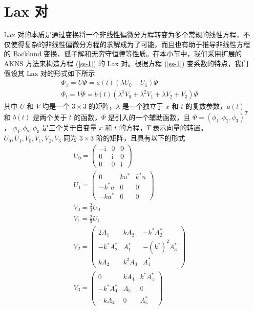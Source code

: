 \section{Lax 对}
Lax 对的本质是通过变换将一个非线性偏微分方程转变为多个常规的线性方程，不仅使得复杂的非线性偏微分方程的求解成为了可能，而且也有助于推导非线性方程的 Ba\"cklund 变换、孤子解和无穷守恒律等性质。在本小节中，我们采用扩展的 AKNS 方法来构造方程 (\ref{ss-1}) 的 Lax 对。根据方程 (\ref{ss-1}) 变系数的特点，我们假设其 Lax 对的形式如下所示
\begin{align}
  & \Phi_{x} = U\Phi = a(t)(\lambda U_{0} + U_{1})\Phi \label{ss-2}\\
  & \Phi_{t} = V\Phi = b(t)(\lambda^{3}V_{0} + \lambda^{2}V_{1} + \lambda V_{2} + V_{3})\Phi  \label{ss-3}
\end{align}
其中 $U$ 和 $V$ 均是一个 $3 \times 3$ 的矩阵，$\lambda$ 是一个独立于 $x$ 和 $t$ 的复数参数，$a(t)$ 和 $b(t)$ 是两个关于 $t$ 的函数，$\Phi$ 是引入的一个辅助函数，且 $\Phi = (\phi_1, \phi_2, \phi_3)^T$， $\phi_1, \phi_2, \phi_3$ 是三个关于自变量 $x$ 和 $t$ 的方程，$T$ 表示向量的转置。$U_{0}, U_{1}, V_{0}, V_{1}, V_{2}, V_{3}$ 同为 $3 \times 3$ 阶的矩阵，且具有以下的形式
\begin{align}
  & U_{0} = \begin{pmatrix}
             -\mathrm{i} & 0 & 0 \\
              0 & \mathrm{i} & 0 \\
              0 & 0 & \mathrm{i}
            \end{pmatrix} \label{ss-lax1} \\
  & U_{1} = \begin{pmatrix}
              0 & ku^{*} & k^{*}u \\
              -k^{*}u & 0 & 0 \\
              -ku^{*} & 0 & 0
            \end{pmatrix}  \\
  & V_{0} = \frac{2}{3}U_{0} \\
  & V_{1} = \frac{2}{3}U_{1} \\
  & V_{2} = \begin{pmatrix}
              2A_{1} & kA_{2} & -k^{*}A_{2}^{*} \\
              -k^{*}A_{2}^{*} & A_{1}^{*} & -(k^{*})^{2}A_{3}^{*} \\
              kA_{2} & k^{2}A_{3} & A_{1}^{*}
            \end{pmatrix}  \\
  & V_{3} = \begin{pmatrix}
              0 & kA_{4} & k^{*}A_{4}^{*} \\
              -k^{*}A_{4}^{*} & A_{5} & 0 \\
              -kA_{4} & 0 & A_{5}^{*}
            \end{pmatrix}  \label{ss-lax2}
\end{align}
